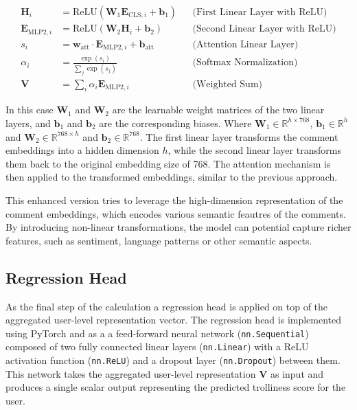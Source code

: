 \documentclass[twoside]{ctuthesis}
\theoremstyle{plain}
\theoremstyle{definition}
\theoremstyle{note}
\begin{document}
\begin{align}
    \mathbf{H}_{i} &= \text{ReLU}(\mathbf{W}_1 \mathbf{E}_{\mathrm{CLS}, i} + \mathbf{b}_1) && \text{(First Linear Layer with ReLU)} \\
    \mathbf{E}_{\mathrm{MLP2}, i} &= \text{ReLU}(\mathbf{W}_2 \mathbf{H}_{i} + \mathbf{b}_2) && \text{(Second Linear Layer with ReLU)} \\
    s_i &= \mathbf{w}_{\mathrm{att}} \cdot \mathbf{E}_{\mathrm{MLP2}, i} + \mathbf{b}_{\mathrm{att}} && \text{(Attention Linear Layer)} \\
    \alpha_i &= \frac{\exp(s_i)}{\sum_{j} \exp(s_j)} && \text{(Softmax Normalization)} \\
    \mathbf{V} &= \sum_i \alpha_i \mathbf{E}_{\mathrm{MLP2}, i} && \text{(Weighted Sum)}
\end{align}

In this case \( \mathbf{W}_1 \) and \( \mathbf{W}_2 \) are the learnable weight matrices of the two linear layers, and \( \mathbf{b}_1 \) and \( \mathbf{b}_2 \) are the corresponding biases. Where \( \mathbf{W}_1 \in \mathbb{R}^{h \times 768} \), \( \mathbf{b}_1 \in \mathbb{R}^{h} \) and  \( \mathbf{W}_2 \in \mathbb{R}^{768 \times h} \) and \( \mathbf{b}_2 \in \mathbb{R}^{768} \). The first linear layer transforms the comment embeddings into a hidden dimension \( h \), while the second linear layer transforms them back to the original embedding size of 768. The attention mechanism is then applied to the transformed embeddings, similar to the previous approach. \par

This enhanced version tries to leverage the high-dimension representation of the comment embeddings, which encodes various semantic feautres of the comments. By introducing non-linear transformations, the model can potential capture richer features, such as sentiment, language patterns or other semantic aspects.\par 

\subsection{Regression Head}

As the final step of the calculation a regression head is applied on top of the aggregated user-level representation vector. The regression head is implemented using PyTorch and as a a feed-forward neural network (\texttt{nn.Sequential}) composed of two fully connected linear layers (\texttt{nn.Linear}) with a ReLU activation function (\texttt{nn.ReLU}) and a dropout layer (\texttt{nn.Dropout}) between them. This network takes the aggregated user-level representation \( \mathbf{V} \) as input and produces a single scalar output representing the predicted trolliness score for the user.\par
\end{document}
